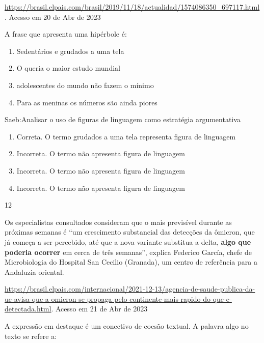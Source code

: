 {{\begin{itemize}
\begin{itemize}
\href{https://brasil.elpais.com/brasil/2019/11/18/actualidad/1574086350_697117.html}{\uline{https://brasil.elpais.com/brasil/2019/11/18/actualidad/1574086350\_697117.html}}.
Acesso em 20 de Abr de 2023

A frase que apresenta uma hipérbole é:

\begin{enumerate}
\def\labelenumi{\alph{enumi})}
\item
  Sedentários e grudados a uma tela
\item
  O queria o maior estudo mundial
\item
  adolescentes do mundo não fazem o mínimo
\item
  Para as meninas os números são ainda piores
\end{enumerate}

Saeb:Analisar o uso de figuras de linguagem como estratégia
argumentativa

\begin{enumerate}
\def\labelenumi{\arabic{enumi}.}
\item
  Correta. O termo grudados a uma tela representa figura de linguagem
\item
  Incorreta. O termo não apresenta figura de linguagem
\item
  Incorreta. O termo não apresenta figura de linguagem
\item
  Incorreta. O termo não apresenta figura de linguagem
\end{enumerate}

\num{12}

Os especialistas consultados consideram que o mais previsível durante as
próximas semanas é ``um crescimento substancial das detecções da
ômicron, que já começa a ser percebido, até que a nova variante
substitua a delta, \textbf{algo que poderia ocorrer} em cerca de três
semanas'', explica Federico García, chefe de Microbiologia do Hospital
San Cecilio (Granada), um centro de referência para a Andaluzia
oriental.

\href{https://brasil.elpais.com/internacional/2021-12-13/agencia-de-saude-publica-da-ue-avisa-que-a-omicron-se-propaga-pelo-continente-mais-rapido-do-que-e-detectada.html}{\uline{https://brasil.elpais.com/internacional/2021-12-13/agencia-de-saude-publica-da-ue-avisa-que-a-omicron-se-propaga-pelo-continente-mais-rapido-do-que-e-detectada.html}}.
Acesso em 21 de Abr de 2023

A expressão em destaque é um conectivo de coesão textual. A palavra algo
no texto se refere a:


\end{itemize}
\end{itemize}}}
